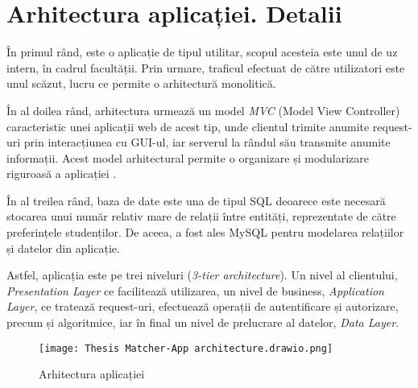 \chapter{Arhitectura aplicației. Detalii}
În primul rând, \textbf{\thesistitle} este o aplicație de tipul utilitar, scopul acesteia este unul de uz intern, în cadrul facultății. Prin urmare, traficul efectuat de către utilizatori este unul scăzut, lucru ce permite o arhitectură monolitică.

În al doilea rând, arhitectura urmează un model \textit{MVC} (Model View Controller) caracteristic unei aplicații web de acest tip, unde clientul trimite anumite request-uri prin interacțiunea cu GUI-ul, iar serverul la rândul său transmite anumite informații. Acest model arhitectural permite o organizare și modularizare riguroasă a aplicației \cite{architecture}.

În al treilea rând, baza de date este una de tipul SQL deoarece este necesară stocarea unui număr relativ mare de relații între entități, reprezentate de către preferințele studenților. De aceea, a fost ales MySQL pentru modelarea relațiilor și datelor din aplicație.

Astfel, aplicația este pe trei niveluri (\textit{3-tier architecture}). Un nivel al clientului, \textit{Presentation Layer} ce facilitează utilizarea, un nivel de business, \textit{Application Layer}, ce tratează request-uri, efectuează operații de autentificare și autorizare, precum și algoritmice, iar în final un nivel de prelucrare al datelor, \textit{Data Layer}.

\begin{figure}[H]
	\centering
	\texttt{[image: Thesis Matcher-App architecture.drawio.png]}
	\caption{Arhitectura aplicației}
\end{figure}